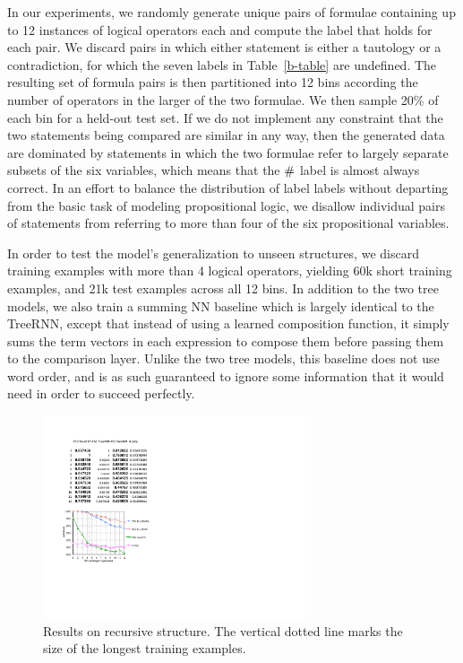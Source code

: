 In our experiments, we randomly generate unique pairs 
of formulae containing up to 12 instances of logical operators each and compute the label that holds for each pair.
We discard pairs in which either statement is either a tautology or a
contradiction, for which the seven labels in
Table~\ref{b-table} are undefined. The resulting set of formula pairs is
then partitioned into 12 bins according the number of operators in
the larger of the two formulae. We then sample 20\% of each
bin for a held-out test set.
If we do not implement any constraint that the two statements being
compared are similar in any way, then the generated data are dominated
by statements in which the two formulae refer to largely separate
subsets of the six variables, which means that the $\mathbin{\#}$ label
is almost always correct.  In an effort to balance the distribution of
label labels without departing from the basic task of modeling
propositional logic, we disallow individual pairs of statements from
referring to more than four of the six propositional variables.

In order to test the model's generalization to unseen structures, we discard
training examples with more than 4 logical operators, yielding 60k short training examples,
and 21k test examples across all 12 bins.
In addition to the two tree models, we also train a summing NN baseline
which is largely identical to the TreeRNN, except that instead of using a learned composition function,
it simply sums the term vectors in each expression to compose them before passing them to the comparison layer. Unlike the two tree models, this baseline does not use word order,
and is as such guaranteed to ignore some information that it would need in order to succeed perfectly.

\begin{figure}[t]
  \centering
  \includegraphics[width=3.05in]{decayfig.pdf}

  \caption{Results on recursive structure. The vertical dotted line marks the size of the longest training examples.}





    
  \label{prop-results} 
\end{figure}


